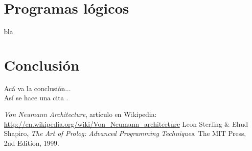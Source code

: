 \documentclass[12pt,titlepage]{article}
\begin{document}
\newpage
\section{Programas lógicos}
bla

\newpage
\section{Conclusión}
Acá va la conclusión... \\
Así se hace una cita \cite{artofprolog}.
	
\clearpage
\begin{thebibliography}{9}
     \emph{Von Neumann Architecture}, artículo en Wikipedia: \url{http://en.wikipedia.org/wiki/Von\_Neumann\_architecture}
     Leon Sterling \& Ehud Shapiro, \emph{The Art of Prolog: Advanced Programming Techniques}. The MIT Press, 2nd Edition, 1999.
\end{thebibliography}

\end{document}
